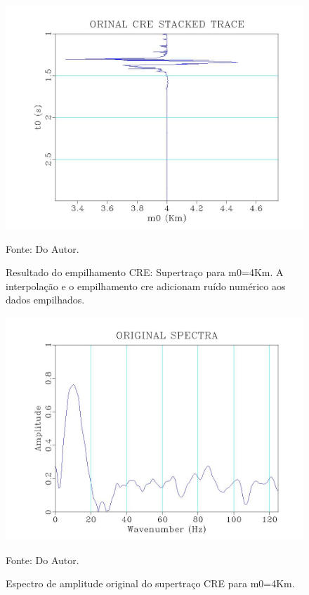 \begin{figure}
\caption{Resultado do empilhamento CRE: Supertraço para m0=4Km. A interpolação e o empilhamento cre adicionam
ruído numérico aos dados empilhados.}
\begin{center}
\includegraphics[scale=0.4]{images/creStackedSection.jpeg}
\vspace{-0.3cm}
\end{center}
\begin{center}
 Fonte: Do Autor.
\end{center}
\label{fig:7.2}
\end{figure}

\begin{figure}
\caption{Espectro de amplitude original do supertraço CRE para m0=4Km.}
\begin{center}
\includegraphics[scale=0.4]{images/originalSpectra.jpeg}
\vspace{-0.3cm}
\end{center}
\begin{center}
 Fonte: Do Autor.
\end{center}
\label{fig:7.3}
\end{figure}

